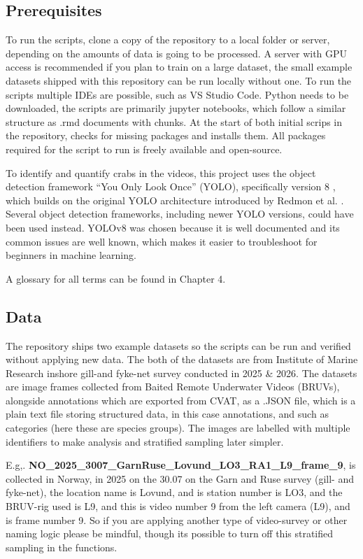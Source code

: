\documentclass[
]{book}
\begin{document}
\subsection{Prerequisites}\label{prerequisites}

To run the scripts, clone a copy of the repository to a local folder or server, depending on the amounts of data is going to be processed. A server with GPU access is recommended if you plan to train on a large dataset, the small example datasets shipped with this repository can be run locally without one. To run the scripts multiple IDEs are possible, such as VS Studio Code. Python needs to be downloaded, the scripts are primarily jupyter notebooks, which follow a similar structure as .rmd documents with chunks. At the start of both initial scrips in the repository, checks for missing packages and installs them. All packages required for the script to run is freely available and open-source.

To identify and quantify crabs in the videos, this project uses the object detection framework ``You Only Look Once'' (YOLO), specifically version 8 \citep{jocher_ultralytics_2023}, which builds on the original YOLO architecture introduced by Redmon et al. \citeyearpar{redmon_you_2016}. Several object detection frameworks, including newer YOLO versions, could have been used instead. YOLOv8 was chosen because it is well documented and its common issues are well known, which makes it easier to troubleshoot for beginners in machine learning.

A glossary for all terms can be found in Chapter 4.

\subsection{Data}\label{data}

The repository ships two example datasets so the scripts can be run and verified without applying new data. The both of the datasets are from Institute of Marine Research inshore gill-and fyke-net survey conducted in 2025 \& 2026. The datasets are image frames collected from Baited Remote Underwater Videos (BRUVs), alongside annotations which are exported from CVAT, as a .JSON file, which is a plain text file storing structured data, in this case annotations, and such as categories (here these are species groups). The images are labelled with multiple identifiers to make analysis and stratified sampling later simpler.

E.g,. \textbf{NO\_2025\_3007\_GarnRuse\_Lovund\_LO3\_RA1\_L9\_frame\_9}, is collected in Norway, in 2025 on the 30.07 on the Garn and Ruse survey (gill- and fyke-net), the location name is Lovund, and is station number is LO3, and the BRUV-rig used is L9, and this is video number 9 from the left camera (L9), and is frame number 9. So if you are applying another type of video-survey or other naming logic please be mindful, though its possible to turn off this stratified sampling in the functions.
\end{document}
